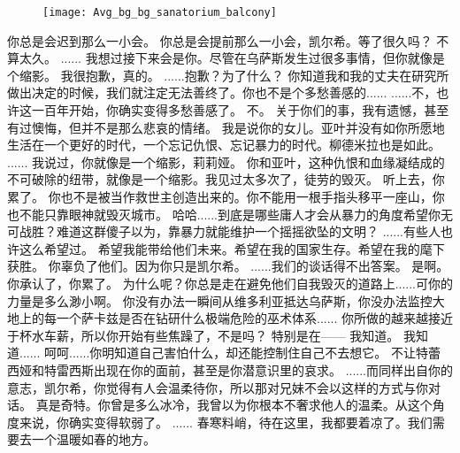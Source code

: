 \documentclass[openany]{book}
\begin{document}
\begin{figure}[h]
    \centering
    \texttt{[image: Avg\_bg\_bg\_sanatorium\_balcony]}
\end{figure}
\begin{dialogue}
     你总是会迟到那么一小会。
     你总是会提前那么一小会，凯尔希。等了很久吗？
     不算太久。
     ......
     我想过接下来会是你。尽管在乌萨斯发生过很多事情，但你就像是个缩影。
     我很抱歉，真的。
     ......抱歉？为了什么？
     你知道我和我的丈夫在研究所做出决定的时候，我们就注定无法善终了。你也不是个多愁善感的......
     ......不，也许这一百年开始，你确实变得多愁善感了。
     不。
     关于你们的事，我有遗憾，甚至有过懊悔，但并不是那么悲哀的情绪。
     我是说你的女儿。亚叶并没有如你所愿地生活在一个更好的时代，一个忘记仇恨、忘记暴力的时代。柳德米拉也是如此。
     ......
     我说过，你就像是一个缩影，莉莉娅。
     你和亚叶，这种仇恨和血缘凝结成的不可破除的纽带，就像是一个缩影。我见过太多次了，徒劳的毁灭。
     听上去，你累了。
     你也不是被当作救世主创造出来的。你不能用一根手指头移平一座山，你也不能只靠眼神就毁灭城市。
     哈哈......到底是哪些庸人才会从暴力的角度希望你无可战胜？难道这群傻子以为，靠暴力就能维护一个摇摇欲坠的文明？
     ......有些人也许这么希望过。
     希望我能带给他们未来。希望在我的国家生存。希望在我的麾下获胜。
     你辜负了他们。因为你只是凯尔希。
     ......我们的谈话得不出答案。
     是啊。你承认了，你累了。
     为什么呢？你总是走在避免他们自我毁灭的道路上......可你的力量是多么渺小啊。
     你没有办法一瞬间从维多利亚抵达乌萨斯，你没办法监控大地上的每一个萨卡兹是否在钻研什么极端危险的巫术体系......
     你所做的越来越接近于杯水车薪，所以你开始有些焦躁了，不是吗？
     特别是在——
     我知道。
     我知道......
     呵呵......你明知道自己害怕什么，却还能控制住自己不去想它。
     不让特蕾西娅和特雷西斯出现在你的面前，甚至是你潜意识里的哀求。
     ......而同样出自你的意志，凯尔希，你觉得有人会温柔待你，所以那对兄妹不会以这样的方式与你对话。
     真是奇特。你曾是多么冰冷，我曾以为你根本不奢求他人的温柔。从这个角度来说，你确实变得软弱了。
     ......
     春寒料峭，待在这里，我都要着凉了。我们需要去一个温暖如春的地方。

\end{dialogue}
\end{document}

